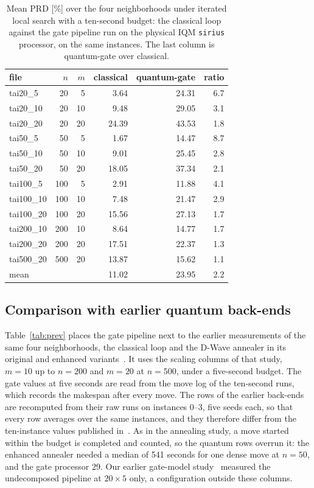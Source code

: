 \documentclass[runningheads]{llncs}
\begin{document}
\begin{table}[!t]
\caption{Mean PRD [\%] over the four neighborhoods under iterated local search
with a ten-second budget: the classical loop against the gate pipeline run on
the physical IQM \texttt{sirius} processor, on the same instances. The last
column is quantum-gate over classical.}
\label{tab:cls}
\centering
\begin{tabular*}{\textwidth}{@{\extracolsep{\fill}}lrrrrr@{}}
\toprule
file & $n$ & $m$ & classical & quantum-gate & ratio \\
\midrule
tai20\_5 & 20 & 5 & 3.64 & 24.31 & 6.7 \\
tai20\_10 & 20 & 10 & 9.48 & 29.05 & 3.1 \\
tai20\_20 & 20 & 20 & 24.39 & 43.53 & 1.8 \\
tai50\_5 & 50 & 5 & 1.67 & 14.47 & 8.7 \\
tai50\_10 & 50 & 10 & 9.01 & 25.45 & 2.8 \\
tai50\_20 & 50 & 20 & 18.05 & 37.34 & 2.1 \\
tai100\_5 & 100 & 5 & 2.91 & 11.88 & 4.1 \\
tai100\_10 & 100 & 10 & 7.48 & 21.47 & 2.9 \\
tai100\_20 & 100 & 20 & 15.56 & 27.13 & 1.7 \\
tai200\_10 & 200 & 10 & 8.64 & 14.77 & 1.7 \\
tai200\_20 & 200 & 20 & 17.51 & 22.37 & 1.3 \\
tai500\_20 & 500 & 20 & 13.87 & 15.62 & 1.1 \\
\midrule
mean & & & 11.02 & 23.95 & 2.2 \\
\bottomrule
\end{tabular*}
\end{table}

\subsection{Comparison with earlier quantum back-ends}
Table~\ref{tab:prev} places the gate pipeline next to the earlier measurements
of the same four neighborhoods, the classical loop and the D-Wave annealer in its original and enhanced
variants~\cite{wojewodzki2026windowed}. It uses the scaling
columns of that study, $m = 10$ up to $n = 200$ and $m = 20$ at $n = 500$,
under a five-second budget. The gate values at five seconds are read from the
move log of the ten-second runs, which records the makespan after every move.
The rows of the earlier back-ends are recomputed from their raw runs on
instances 0--3, five seeds each, so that every row averages over the same
instances, and they therefore differ from the ten-instance values published
in~\cite{wojewodzki2026windowed}. As in the annealing study, a move started
within the budget is completed and counted, so the quantum rows overrun it: the enhanced annealer needed a median of 541 seconds for one dense move at
$n = 50$, and the gate processor 29. Our earlier gate-model
study~\cite{wojewodzki2026gcmm} measured the undecomposed pipeline at
$20 \times 5$ only, a configuration outside these columns.
\end{document}
